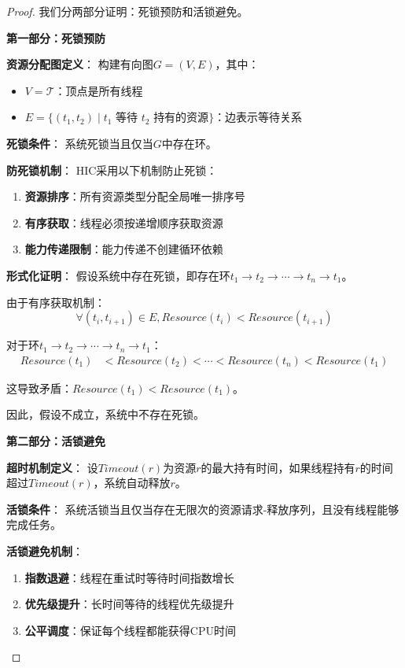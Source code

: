 \documentclass{article}
\theoremstyle{definition}
\theoremstyle{remark}
\begin{document}
\begin{proof}
    我们分两部分证明：死锁预防和活锁避免。

    \textbf{第一部分：死锁预防}

    \textbf{资源分配图定义}：
    构建有向图$G = (V, E)$，其中：
    \begin{itemize}
        \item $V = \mathcal{T}$：顶点是所有线程
        \item $E = \{(t_1, t_2) \mid t_1 \text{ 等待 } t_2 \text{ 持有的资源}\}$：边表示等待关系
    \end{itemize}

    \textbf{死锁条件}：
    系统死锁当且仅当$G$中存在环。

    \textbf{防死锁机制}：
    HIC采用以下机制防止死锁：
    \begin{enumerate}
        \item \textbf{资源排序}：所有资源类型分配全局唯一排序号
        \item \textbf{有序获取}：线程必须按递增顺序获取资源
        \item \textbf{能力传递限制}：能力传递不创建循环依赖
    \end{enumerate}

    \textbf{形式化证明}：
    假设系统中存在死锁，即存在环$t_1 \rightarrow t_2 \rightarrow \cdots \rightarrow t_n \rightarrow t_1$。

    由于有序获取机制：
    \[
    \forall (t_i, t_{i+1}) \in E, Resource(t_i) < Resource(t_{i+1})
    \]

    对于环$t_1 \rightarrow t_2 \rightarrow \cdots \rightarrow t_n \rightarrow t_1$：
    \begin{align*}
        Resource(t_1) &< Resource(t_2) < \cdots < Resource(t_n) < Resource(t_1)
    \end{align*}

    这导致矛盾：$Resource(t_1) < Resource(t_1)$。

    因此，假设不成立，系统中不存在死锁。

    \textbf{第二部分：活锁避免}

    \textbf{超时机制定义}：
    设$Timeout(r)$为资源$r$的最大持有时间，如果线程持有$r$的时间超过$Timeout(r)$，系统自动释放$r$。

    \textbf{活锁条件}：
    系统活锁当且仅当存在无限次的资源请求-释放序列，且没有线程能够完成任务。

    \textbf{活锁避免机制}：
    \begin{enumerate}
        \item \textbf{指数退避}：线程在重试时等待时间指数增长
        \item \textbf{优先级提升}：长时间等待的线程优先级提升
        \item \textbf{公平调度}：保证每个线程都能获得CPU时间
    \end{enumerate}


\end{proof}
\end{document}
